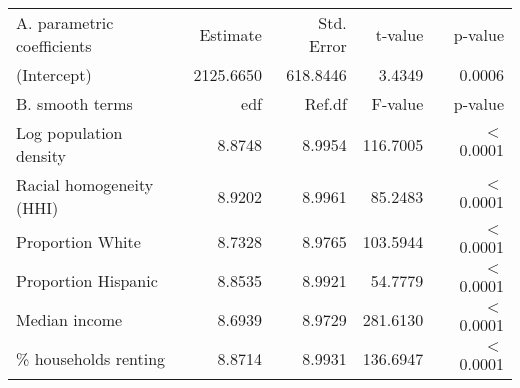 \begin{table}[ht]
\centering
\begin{tabular}{lrrrr}
   \hline
A. parametric coefficients & Estimate & Std. Error & t-value & p-value \\ 
  (Intercept) & 2125.6650 & 618.8446 & 3.4349 & 0.0006 \\ 
   \hline
B. smooth terms & edf & Ref.df & F-value & p-value \\ 
  Log population density & 8.8748 & 8.9954 & 116.7005 & $<$ 0.0001 \\ 
  Racial homogeneity (HHI) & 8.9202 & 8.9961 & 85.2483 & $<$ 0.0001 \\ 
  Proportion White & 8.7328 & 8.9765 & 103.5944 & $<$ 0.0001 \\ 
  Proportion Hispanic & 8.8535 & 8.9921 & 54.7779 & $<$ 0.0001 \\ 
  Median income & 8.6939 & 8.9729 & 281.6130 & $<$ 0.0001 \\ 
  \% households renting & 8.8714 & 8.9931 & 136.6947 & $<$ 0.0001 \\ 
   \hline
\end{tabular}
\caption{ } 
\label{Demographic GAM}
\end{table}
